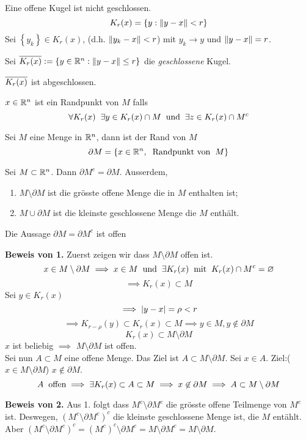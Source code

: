 \begin{Bsp}
  Eine offene Kugel ist nicht geschlossen.
  \[K_r(x)=\left\{ y:\left\| y-x \right\|<r \right\}\]
  Sei $\left\{ y_k \right\}\in K_r(x)$, (d.h. $\left\| y_k-x \right\|<r$) mit $y_k\to y$ und $\left\| y-x \right\|=r$.
\end{Bsp}
\begin{Def}
  Sei $\overline{K_r(x)}:=\left\{ y\in\mathbb{R}^n:\left\| y-x \right\|\leq r \right\}$ die {\em geschlossene} Kugel.
\end{Def}
\begin{Ueb}
  $\overline{K_r(x)}$ ist abgeschlossen.
\end{Ueb}
\begin{Def}
  $x\in\mathbb{R}^n$ ist ein Randpunkt von $M$ falls
  \[\forall K_r(x)\hspace{2mm}\exists y\in K_r(x)\cap M\hspace{2mm}\text{und}\hspace{2mm} \exists z\in K_r(x)\cap M^c\]
\end{Def}
\begin{Def}
  Sei $M$ eine Menge in $\mathbb{R}^n$, dann ist der Rand von $M$
  \[\partial M=\left\{ x\in\mathbb{R}^n, \hspace{2mm}\text{Randpunkt von}\hspace{2mm} M \right\}\]
\end{Def}
\begin{Sat}Sei $M\subset \mathbb{R}^n$. Dann
  $\partial M^c=\partial M$. Ausserdem,
  \begin{enumerate}
    \item $M\setminus \partial M$ ist die grösste offene Menge die in $M$ enthalten ist;
    \item $M\cup \partial M$ ist die kleinste geschlossene Menge die $M$ enthält.
  \end{enumerate}
\end{Sat}
\begin{Bew} Die Aussage $\partial M = \partial M^c$ ist offen

\medskip

{\bf Beweis von 1.}  Zuerst zeigen wir dass $M\setminus \partial M$ offen ist. 
  \[x\in M\setminus \partial M \implies x\in M\hspace{2mm}\text{und}\hspace{2mm} \exists K_r(x)\hspace{2mm}\text{mit}\hspace{2mm} K_r(x)\cap M^c=\varnothing\]
  \[\implies K_r(x)\subset M\]
  Sei $y\in K_r(x)$
  \[\implies \left| y-x \right|=\rho<r\]
  \[\implies K_{r-\rho}(y)\subset K_r(x)\subset M\implies y\in M,y\not\in \partial M\]
  \[K_r(x)\subset M\setminus \partial M\]
  $x$ ist beliebig $\implies$ $M\setminus \partial M$ ist offen.\\
  Sei nun $A\subset M$ eine offene Menge. Das Ziel ist $A\subset M\setminus\partial M$. Sei $x\in A$. Ziel:($x\in M\setminus\partial M$) $x\not\in \partial M$.
  \[A\hspace{2mm}\text{offen}\implies \exists K_r(x)\subset A\subset M\implies x\not\in \partial M\implies A\subset M\setminus\partial M\]

\medskip

{\bf Beweis von 2.} Aus 1. folgt dass $M^c \setminus \partial M^c$ die gr\"osste offene
Teilmenge von $M^c$ ist. Deswegen, $(M^c\setminus \partial M^c)^c$ die kleinste geschlossene
Menge ist, die $M$ ent\"ahlt. Aber $(M^c\setminus \partial M^c)^c = (M^c)^c\setminus \partial M^c =
M\setminus \partial M^c = M\setminus \partial M$.

\end{Bew}
